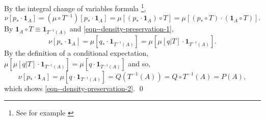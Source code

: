 By the integral change of variables formula%
\footnote{See for example \citet[Theorem 3.6.1]{2007bogachevMeasureTheory}},
\begin{equation*}
  \nu \left[ p_{\ast} \cdot \mathbf{1}_{A} \right] = (\mu \circ T^{- 1}) \left[
  p_{\ast} \cdot \mathbf{1}_{A} \right] = \mu \left[ \left( p_{\ast} \cdot
  \mathbf{1}_{A} \right) \circ T \right] = \mu \left[ \left( p_{\ast} \circ T
  \right) \cdot \left( \mathbf{1}_{A} \circ T \right) \right].
\end{equation*}
By \(\mathbf{1}_{A} \circ T \equiv \mathbf{1}_{T^{- 1} (A)}\) and
\eqref{eqn--density-preservation-1},
\begin{equation*}
  \nu \left[ p_{\ast} \cdot \mathbf{1}_{A} \right] = \mu \left[ q_{\ast}
  \cdot \mathbf{1}_{T^{- 1} (A)} \right] = \mu \left[ \mu [q | T] \cdot
  \mathbf{1}_{T^{- 1} (A)} \right].
\end{equation*}
By the definition of a conditional expectation,
\(\mu \left[ \mu [q | T] \cdot \mathbf{1}_{T^{- 1} (A)} \right] = \mu \left[ q
\cdot \mathbf{1}_{T^{- 1} (A)} \right]\) and so,
\begin{equation*}
  \nu \left[ p_{\ast} \cdot \mathbf{1}_{A} \right] =
  \mu \left[ q \cdot \mathbf{1}_{T^{- 1} (A)} \right] = Q \left( T^{- 1}
  (A) \right) = Q \circ T^{- 1} (A) =
  P (A),
\end{equation*}
which shows \eqref{eqn--density-preservation-2}.
\qed

